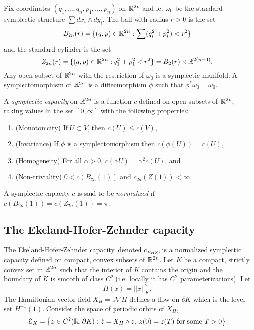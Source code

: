 \documentclass[../capacities_main.tex]{subfiles}
\begin{document}
	
	
	
	Fix coordinates $(q_1, \ldots ,q_n,p_1, \ldots ,p_n)$ on ${\mathbb R}^{2n}$ and let $\omega_0$ be the standard symplectic structure $\sum dx_i\wedge dy_i$.  The ball with radius $r>0$ is the set 
	\begin{equation*}
	B_{2n}(r) = \{ (q,p) \in {\mathbb R}^{2n} : \sum (q_i^2 + p_i^2)< r^2 \}
	\end{equation*}
	and the standard cylinder is the set 
	\begin{equation*}
	Z_{2n}(r) = \{ (q,p) \in {\mathbb R}^{2n} : q_1^2 + p_1^2< r^2 \} = B_2(r) \times {\mathbb R}^{2(n-1)}.
	\end{equation*}
	Any open subset of ${\mathbb R}^{2n}$ with the restriction of $\omega_0$ is a symplectic manifold.  A symplectomorphism of ${\mathbb R}^{2n}$ is a diffeomorphism $\phi$ such that $\phi^*\omega_0 = \omega_0$.
	
	\begin{Definition}
		A \emph{symplectic capacity} on ${\mathbb R}^{2n}$ is a function $c$ defined on open subsets of ${\mathbb R}^{2n}$, taking values in the set $[0,\infty]$ with the following properties:
		\begin{enumerate}
			\item (Monotonicity) If $U \subset V$, then $c(U) \leq c(V)$,
			\item (Invariance) If $\phi$ is a symplectomorphism then $c(\phi(U)) = c(U)$,
			\item (Homogeneity) For all $\alpha >0$, $c(\alpha U) = \alpha^2 c(U)$, and
			\item (Non-triviality) $0 < c(B_{2n}(1))$ and $c_{2n}(Z(1)) < \infty$.
		\end{enumerate}
		A symplectic capacity $c$ is said to be \emph{normalized} if $c(B_{2n}(1)) = c(Z_{2n}(1)) = \pi$.
	\end{Definition}
	
	\subsection{The Ekeland-Hofer-Zehnder capacity}
	
	The Ekeland-Hofer-Zehnder capacity, denoted $c_{EHZ}$, is a normalized symplectic capacity defined on compact, convex subsets of ${\mathbb R}^{2n}$. Let $K$ be a compact, strictly convex set in ${\mathbb R}^{2n}$ such that the interior of $K$ contains the origin and the boundary of $K$ is smooth of class $C^2$ (i.e. locally it has $C^2$ parameterizations).  Let
	\begin{equation*}
	H(x) = ||x||_K^2.
	\end{equation*}
	The Hamiltonian vector field $X_H = J\nabla H$ defines a flow on $\partial K$ which is the level set $H^{-1}(1)$.  Consider the space of periodic orbits of $X_H$, 
	\begin{equation*}
	\mathcal{E}_K = \left\{ z \in C^2( {\mathbb R},\partial K) : \dot z = X_H\circ z,\ z(0)=z(T) \text{ for some }T>0\right\}
	\end{equation*}
	
\end{document}
